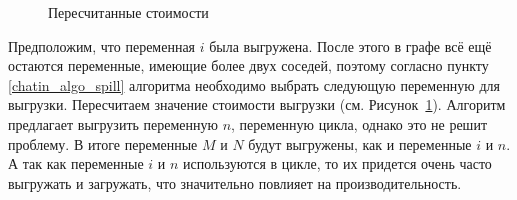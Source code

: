 \begin{figure}[H]
    \centering
    \caption{Пересчитанные стоимости}
    \label{fig:chatin_problem_2}
\end{figure}

Предположим, что переменная $i$ была выгружена.
После этого в графе всё ещё остаются переменные, имеющие более двух соседей,
поэтому согласно пункту \ref{chatin_algo_spill} алгоритма необходимо выбрать следующую переменную для выгрузки.
Пересчитаем значение стоимости выгрузки (см. Рисунок~\ref{fig:chatin_problem_2}).
Алгоритм предлагает выгрузить переменную $n$, переменную цикла, однако это не решит проблему.
В итоге переменные $M$ и $N$ будут выгружены, как и переменные $i$ и $n$.
А так как переменные $i$ и $n$ используются в цикле, то их придется очень часто выгружать и загружать, что
значительно повлияет на производительность.
